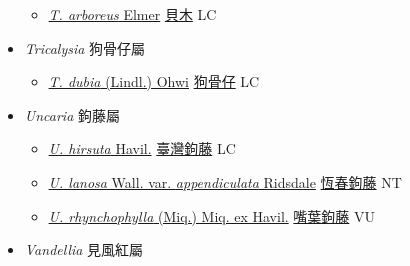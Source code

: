 \begin{itemize}
  \begin{itemize}
        \item[] \href{http://www.theplantlist.org/tpl1.1/search?q=Timonius+arboreus}{\textit{T. arboreus} Elmer}   \href{\detokenize{http://taibnet.sinica.edu.tw/chi/taibnet_species_list.php?T2=貝木&T2_new_value=true&fr=y}}{貝木} LC
  \end{itemize}
 \item[] \textit{Tricalysia} 狗骨仔屬
                    
  \begin{itemize}
        \item[] \href{http://www.theplantlist.org/tpl1.1/search?q=Tricalysia+dubia}{\textit{T. dubia} (Lindl.) Ohwi}   \href{\detokenize{http://taibnet.sinica.edu.tw/chi/taibnet_species_list.php?T2=狗骨仔&T2_new_value=true&fr=y}}{狗骨仔} LC
  \end{itemize}
 \item[] \textit{Uncaria} 鉤藤屬
                    
  \begin{itemize}
        \item[] \href{http://www.theplantlist.org/tpl1.1/search?q=Uncaria+hirsuta}{\textit{U. hirsuta} Havil.}   \href{\detokenize{http://taibnet.sinica.edu.tw/chi/taibnet_species_list.php?T2=臺灣鉤藤&T2_new_value=true&fr=y}}{臺灣鉤藤} LC
        \item[] \href{http://www.theplantlist.org/tpl1.1/search?q=Uncaria+lanosa+var.+appendiculata}{\textit{U. lanosa} Wall. var. \textit{appendiculata} Ridsdale}   \href{\detokenize{http://taibnet.sinica.edu.tw/chi/taibnet_species_list.php?T2=恆春鉤藤&T2_new_value=true&fr=y}}{恆春鉤藤} NT
        \item[] \href{http://www.theplantlist.org/tpl1.1/search?q=Uncaria+rhynchophylla}{\textit{U. rhynchophylla} (Miq.) Miq. ex Havil.}   \href{\detokenize{http://taibnet.sinica.edu.tw/chi/taibnet_species_list.php?T2=嘴葉鉤藤&T2_new_value=true&fr=y}}{嘴葉鉤藤} VU
  \end{itemize}
 \item[] \textit{Vandellia} 見風紅屬
                    

\end{itemize}
